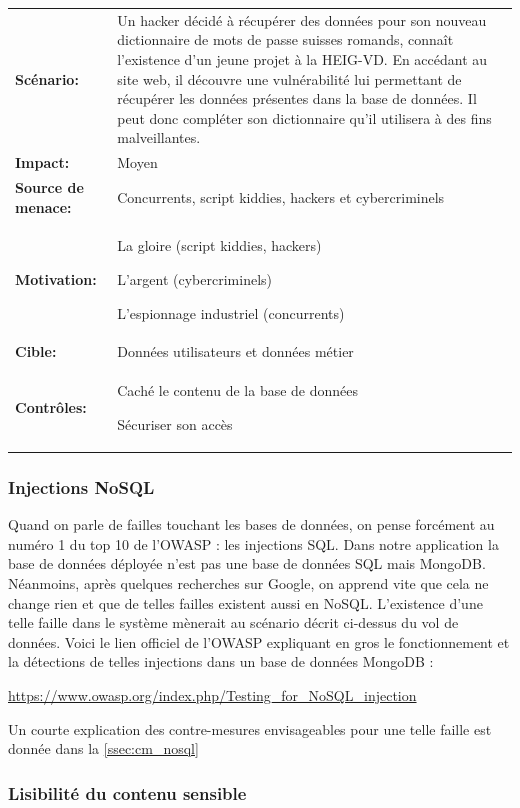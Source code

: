 \documentclass[12pt]{article}
\begin{document}
\renewcommand{\arraystretch}{1.6}
\begin{tabular}{@{}p{4cm}p{12cm}}
\textbf{Scénario:} &  Un hacker décidé à récupérer des données pour son nouveau dictionnaire de mots de passe suisses romands, connaît l'existence d'un jeune projet à la HEIG-VD. En accédant au site web, il découvre une vulnérabilité lui permettant de récupérer les données présentes dans la base de données. Il peut donc compléter son dictionnaire qu'il utilisera à des fins malveillantes. \\
\textbf{Impact:} & Moyen \\
\textbf{Source de menace: } & Concurrents, script kiddies, hackers et cybercriminels \\
\textbf{Motivation:} & La gloire (script kiddies, hackers)

L'argent (cybercriminels)

L'espionnage industriel (concurrents) \\
\textbf{Cible:} & Données utilisateurs et données métier \\
\textbf{Contrôles:} & Caché le contenu de la base de données

Sécuriser son accès
\end{tabular}
\renewcommand{\arraystretch}{1}

\subsubsection{Injections NoSQL}

Quand on parle de failles touchant les bases de données, on pense forcément au numéro 1 du top 10 de l'OWASP : les injections SQL. Dans notre application la base de données déployée n'est pas une base de données SQL mais MongoDB. Néanmoins, après quelques recherches sur Google, on apprend vite que cela ne change rien et que de telles failles existent aussi en NoSQL. L'existence d'une telle faille dans le système mènerait au scénario décrit ci-dessus du vol de données. Voici le lien officiel de l'OWASP expliquant en gros le fonctionnement et la détections de telles injections dans un base de données MongoDB : 

\url{https://www.owasp.org/index.php/Testing_for_NoSQL_injection}

Un courte explication des contre-mesures envisageables pour une telle faille est donnée dans la \autoref{ssec:cm_nosql}

\subsubsection{Lisibilité du contenu sensible}
\end{document}
